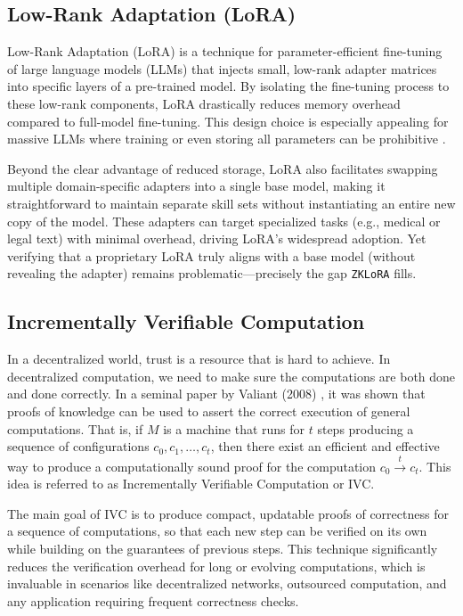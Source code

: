 \documentclass[11pt]{article}
\begin{document}
\subsection{Low-Rank Adaptation (LoRA)}
Low-Rank Adaptation (LoRA) \cite{hu2021lora} is a technique for parameter-efficient fine-tuning of large language models (LLMs) that injects small, low-rank adapter matrices into specific layers of a pre-trained model. By isolating the fine-tuning process to these low-rank components, LoRA drastically reduces memory overhead compared to full-model fine-tuning. This design choice is especially appealing for massive LLMs where training or even storing all parameters can be prohibitive \cite{ding2022delta}.

Beyond the clear advantage of reduced storage, LoRA also facilitates swapping multiple domain-specific adapters into a single base model, making it straightforward to maintain separate skill sets without instantiating an entire new copy of the model. These adapters can target specialized tasks (e.g., medical or legal text) with minimal overhead, driving LoRA’s widespread adoption. Yet verifying that a proprietary LoRA truly aligns with a base model (without revealing the adapter) remains problematic—precisely the gap \texttt{ZKLoRA} fills.

\subsection{Incrementally Verifiable Computation}
In a decentralized world, trust is a resource that is hard to achieve. In decentralized computation, we need to make sure the computations are both done and done correctly. In a seminal paper by Valiant (2008) \cite{valiant2008incrementally}, it was shown that proofs of knowledge can be used to assert the correct execution of general computations. That is, if $M$ is a machine that runs for $t$ steps producing a sequence of configurations $c_0,c_1,\dots,c_t$, then there exist an efficient and effective way to produce a computationally sound proof for the computation $c_0  \xrightarrow{t} c_t$. This idea is referred to as Incrementally Verifiable Computation or IVC.

The main goal of IVC is to produce compact, updatable proofs of correctness for a sequence of computations, so that each new step can be verified on its own while building on the guarantees of previous steps. This technique significantly reduces the verification overhead for long or evolving computations, which is invaluable in scenarios like decentralized networks, outsourced computation, and any application requiring frequent correctness checks.
\end{document}
